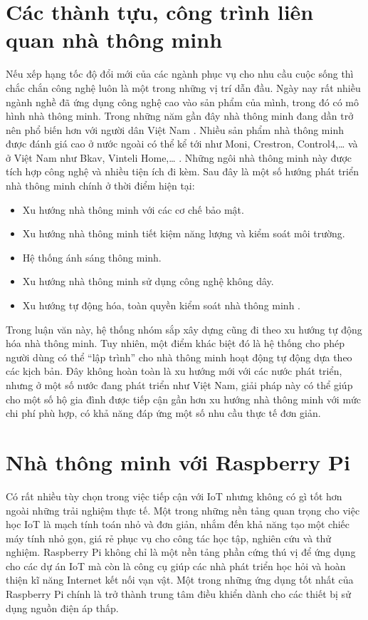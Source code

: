 \documentclass[12pt,a4paper,oneside]{extbook}
\begin{document}
\section{Các thành tựu, công trình liên quan nhà thông minh}

Nếu xếp hạng tốc độ đổi mới của các ngành phục vụ cho nhu cầu cuộc sống thì chắc chắn công nghệ luôn là một trong những vị trí dẫn đầu. Ngày nay rất nhiều ngành nghề đã ứng dụng công nghệ cao vào sản phẩm của mình, trong đó có mô hình nhà thông minh. Trong những năm gần đây nhà thông minh đang dần trở nên phổ biến hơn với người dân Việt Nam \cite{smarthome-trend-2016}. Nhiều sản phẩm nhà thông minh được đánh giá cao ở nước ngoài có thể kể tới như Moni, Crestron, Control4,\dots\hspace{0mm} và ở Việt Nam như Bkav, Vinteli Home,\dots\hspace{0mm} \cite{the-best-smarthome}. Những ngôi nhà thông minh này được tích hợp công nghệ và nhiều tiện ích đi kèm. Sau đây là một số hướng phát triển nhà thông minh chính ở thời điểm hiện tại:

\begin{itemize}[topsep=1mm,itemsep=-0.5mm]
\item Xu hướng nhà thông minh với các cơ chế bảo mật.
\item Xu hướng nhà thông minh tiết kiệm năng lượng và kiểm soát môi trường.
\item Hệ thống ánh sáng thông minh.
\item Xu hướng nhà thông minh sử dụng công nghệ không dây.
\item Xu hướng tự động hóa, toàn quyền kiểm soát nhà thông minh \cite{top-4-smarthome}.
\vspace{1mm}
\end{itemize}

\noindent
Trong luận văn này, hệ thống nhóm sắp xây dựng cũng đi theo xu hướng tự động hóa nhà thông minh. Tuy nhiên, một điểm khác biệt đó là hệ thống cho phép người dùng có thể “lập trình” cho nhà thông minh hoạt động tự động dựa theo các kịch bản. Đây không hoàn toàn là xu hướng mới với các nước phát triển, nhưng ở một số nước đang phát triển như Việt Nam, giải pháp này có thể giúp cho một số hộ gia đình được tiếp cận gần hơn xu hướng nhà thông minh với mức chi phí phù hợp, có khả năng đáp ứng một số nhu cầu thực tế đơn giản.

\section{Nhà thông minh với Raspberry Pi}
Có rất nhiều tùy chọn trong việc tiếp cận với IoT nhưng không có gì tốt hơn ngoài những trải nghiệm thực tế. Một trong những nền tảng quan trọng cho việc học IoT là mạch tính toán nhỏ và đơn giản, nhắm đến khả năng tạo một chiếc máy tính nhỏ gọn, giá rẻ phục vụ cho công tác học tập, nghiên cứu và thử nghiệm. Raspberry Pi không chỉ là một nền tảng phần cứng thú vị để ứng dụng cho các dự án IoT mà còn là công cụ giúp các nhà phát triển học hỏi và hoàn thiện kĩ năng Internet kết nối vạn vật. Một trong những ứng dụng tốt nhất của Raspberry Pi chính là trở thành trung tâm điều khiển dành cho các thiết bị sử dụng nguồn điện áp thấp.
\end{document}
